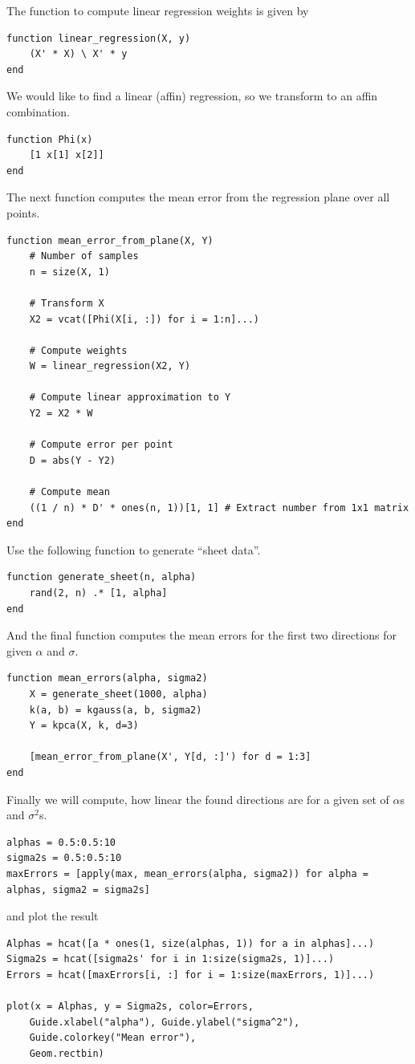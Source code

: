 \documentclass[10pt,a4paper]{article}
\begin{document}
The function to compute linear regression weights is given by
\begin{verbatim}
function linear_regression(X, y)
    (X' * X) \ X' * y
end
\end{verbatim}
We would like to find a linear (affin) regression, so we transform to an affin
combination.
\begin{verbatim}
function Phi(x)
    [1 x[1] x[2]]
end
\end{verbatim}
The next function computes the mean error from the regression plane over all
points.
\begin{verbatim}
function mean_error_from_plane(X, Y)
    # Number of samples
    n = size(X, 1)

    # Transform X
    X2 = vcat([Phi(X[i, :]) for i = 1:n]...)

    # Compute weights
    W = linear_regression(X2, Y)

    # Compute linear approximation to Y
    Y2 = X2 * W

    # Compute error per point
    D = abs(Y - Y2)

    # Compute mean
    ((1 / n) * D' * ones(n, 1))[1, 1] # Extract number from 1x1 matrix
end
\end{verbatim}
Use the following function to generate ``sheet data''.
\begin{verbatim}
function generate_sheet(n, alpha)
    rand(2, n) .* [1, alpha]
end
\end{verbatim}
And the final function computes the mean errors for the first two directions for
given $\alpha$ and $\sigma$.
\begin{verbatim}
function mean_errors(alpha, sigma2)
    X = generate_sheet(1000, alpha)
    k(a, b) = kgauss(a, b, sigma2)
    Y = kpca(X, k, d=3)

    [mean_error_from_plane(X', Y[d, :]') for d = 1:3]
end
\end{verbatim}
Finally we will compute, how linear the found directions are for a given set of
$\alpha$s and $\sigma^{2}$s.
\begin{verbatim}
alphas = 0.5:0.5:10
sigma2s = 0.5:0.5:10
maxErrors = [apply(max, mean_errors(alpha, sigma2)) for alpha = alphas, sigma2 = sigma2s]
\end{verbatim}
and plot the result
\begin{verbatim}
Alphas = hcat([a * ones(1, size(alphas, 1)) for a in alphas]...)
Sigma2s = hcat([sigma2s' for i in 1:size(sigma2s, 1)]...)
Errors = hcat([maxErrors[i, :] for i = 1:size(maxErrors, 1)]...)

plot(x = Alphas, y = Sigma2s, color=Errors,
    Guide.xlabel("alpha"), Guide.ylabel("sigma^2"),
    Guide.colorkey("Mean error"),
    Geom.rectbin)
\end{verbatim}
\end{document}
